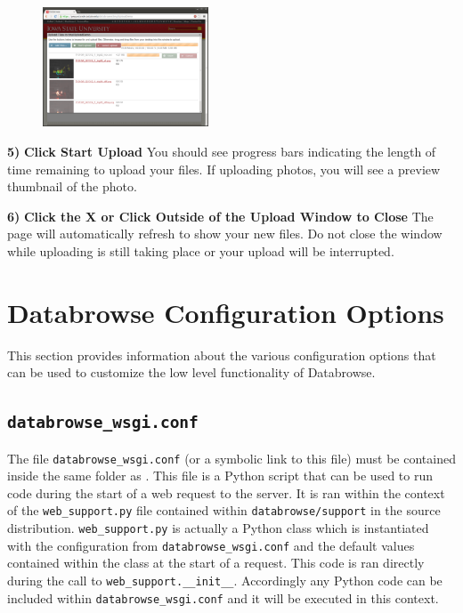 \documentclass[10pt]{article}
\begin{document}
\endgroup

\hfill \break

\begingroup
\setlength\intextsep{0pt}
\begin{figure}
		\includegraphics[width=1.9339in]{Upload2.png}
\end{figure}
\noindent\textbf{5)} \textbf{Click Start Upload} \newline You should see progress bars indicating the length of time remaining to upload your files.  If uploading photos, you will see a preview thumbnail of the photo. 

\endgroup

\hfill \break
\hfill \break
\hfill \break
\hfill \break

\begin{changemargin}{0in}{150.4pt}
\noindent\textbf{6)} \textbf{Click the X or Click Outside of the Upload Window to Close} \newline The page will automatically refresh to show your new files.  Do not close the window while uploading is still taking place or your upload will be interrupted.
\end{changemargin}


\clearpage
\section{Databrowse Configuration Options}
\label{ConfigOptions}

This section provides information about the various configuration options that can be used to customize the low level functionality of Databrowse.

\subsection{\texttt{databrowse\_wsgi.conf}}

The file \texttt{databrowse\_wsgi.conf} (or a symbolic link to this file) must be contained inside the same folder as .  This file is a Python script that can be used to run code during the start of a web request to the server.  It is ran within the context of the \texttt{web\_support.py} file contained within \texttt{databrowse/support} in the source distribution.  \texttt{web\_support.py} is actually a Python class which is instantiated with the configuration from \texttt{databrowse\_wsgi.conf} and the default values contained within the class at the start of a request.  This code is ran directly during the call to \texttt{web\_support.\_\_init\_\_}.  Accordingly any Python code can be included within \texttt{databrowse\_wsgi.conf} and it will be executed in this context.
\end{document}
